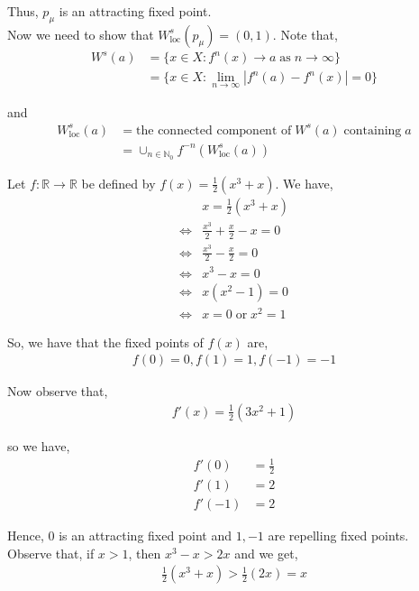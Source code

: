 \documentclass[12pt]{article}
\newenvironment{problem}[2][Problem]{\begin{trivlist}
\item[\hskip \labelsep {\bfseries #1}\hskip \labelsep {\bfseries #2.}]}{\end{trivlist}}
\begin{document}
\begin{enumerate}[label=(\alph*)]
Thus, $p_{\mu}$ is an attracting fixed point.\\

Now we need to show that $W^s_{\text{loc}}(p_{\mu}) = (0, 1)$. Note that,
\begin{align*}
W^s(a) &= \{x \in X: f^n(x) \to a \; \text{as} \; n \to \infty\}\\
&= \{x \in X: \lim_{n \to \infty} |f^n(a) - f^n(x)| = 0\}
\end{align*}

and
\begin{align*}
W^s_{\text{loc}}(a) &= \text{the connected component of} \; W^s(a) \; \text{containing} \; a\\
&= \cup_{n \in \mathbb{N}_0} f^{-n} \left(W^s_{\text{loc}}(a)\right)
\end{align*}
\end{enumerate}

\begin{problem}{4}
\end{problem}

Let $f: \mathbb{R} \to \mathbb{R}$ be defined by $f(x) = \frac{1}{2}(x^3 + x)$. We have,
\begin{align*}
&x = \frac{1}{2}(x^3 + x)\\
\iff &\frac{x^3}{2} + \frac{x}{2} - x = 0\\
\iff &\frac{x^3}{2} - \frac{x}{2} = 0\\
\iff &x^3 - x = 0\\
\iff &x(x^2 - 1) = 0\\
\iff &x = 0 \; \text{or} \; x^2 = 1
\end{align*}

So, we have that the fixed points of $f(x)$ are,
\begin{align*}
f(0) = 0, f(1) = 1, f(-1) = -1
\end{align*}

Now observe that,
\begin{align*}
f'(x) = \frac{1}{2}(3x^2 + 1)
\end{align*}

so we have,
\begin{align*}
f'(0) &= \frac{1}{2}\\
f'(1) &= 2\\
f'(-1) &= 2
\end{align*}

Hence, $0$ is an attracting fixed point and $1, -1$ are repelling fixed points.\\

Observe that, if $x > 1$, then $x^3 - x > 2x$ and we get,
\begin{align*}
\frac{1}{2} (x^3 + x) > \frac{1}{2} (2x) = x
\end{align*}
\end{document}
